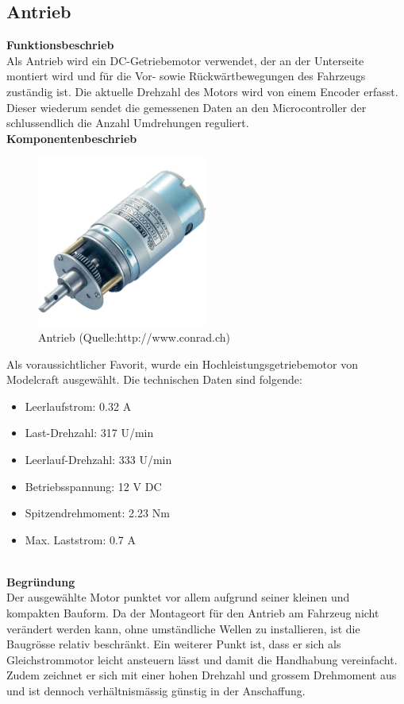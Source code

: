 \subsection{Antrieb}

\textbf{Funktionsbeschrieb}\\[0.2cm]
Als Antrieb wird ein DC-Getriebemotor verwendet, der an der Unterseite montiert wird und für die Vor- sowie Rückwärtbewegungen des Fahrzeugs zuständig ist.
Die aktuelle Drehzahl des Motors wird von einem Encoder erfasst. Dieser wiederum sendet die gemessenen Daten an den Microcontroller der schlussendlich die Anzahl Umdrehungen reguliert.\\[0.2cm]
\textbf{Komponentenbeschrieb}
\begin{figure}[h]
\centering
\includegraphics[width=0.5\textwidth]{03_Loesungskonzept/pictures/antrieb.jpg}
\caption{Antrieb  (Quelle:http://www.conrad.ch)}	
\end{figure}\flushleft
Als voraussichtlicher Favorit, wurde ein Hochleistungsgetriebemotor von Modelcraft ausgewählt. Die technischen Daten sind folgende:
\begin{itemize}
\item Leerlaufstrom: 0.32 A
\item Last-Drehzahl: 317 U/min
\item Leerlauf-Drehzahl: 333 U/min
\item Betriebsspannung: 12 V DC
\item Spitzendrehmoment: 2.23 Nm
\item Max. Laststrom: 0.7 A
\end{itemize}\\[0.2cm]
\textbf{Begründung}\\[0.2cm]
Der ausgewählte Motor punktet vor allem aufgrund seiner kleinen und kompakten Bauform. Da der Montageort für den Antrieb am Fahrzeug nicht verändert werden kann, ohne umständliche Wellen zu installieren, ist die Baugrösse relativ beschränkt.
Ein weiterer Punkt ist, dass er sich als Gleichstrommotor leicht ansteuern lässt und damit die Handhabung vereinfacht.
Zudem zeichnet er sich mit einer hohen Drehzahl und grossem Drehmoment aus und ist dennoch verhältnismässig günstig in der Anschaffung.\\[0.2cm]
